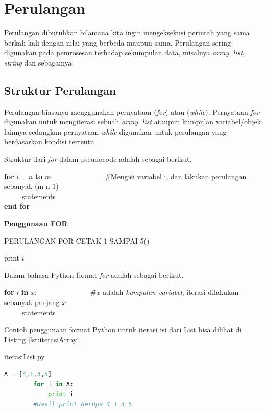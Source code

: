 \section{Perulangan}
Perulangan dibutuhkan bilamana kita ingin mengeksekusi perintah yang sama berkali-kali dengan nilai yang berbeda maupun sama. Perulangan sering digunakan pada pemrosesan terhadap sekumpulan data, misalnya \textit{array}, \textit{list}, \textit{string} dan sebagainya.

\subsection{Struktur Perulangan}
Perulangan biasanya menggunakan pernyataan (\textit{for}) atau (\textit{while}). Pernyataan \textit{for} digunakan untuk mengiterasi sebuah \textit{array}, \textit{list} ataupun kumpulan variabel/objek lainnya sedangkan pernyataan \textit{while} digunakan untuk perulangan yang berdasarkan kondisi tertentu.

Struktur dari \textit{for} dalam pseudocode adalah sebagai berikut.
\begin{tabbing}
\textbf{for} $i=n$ \textbf{to} $m$~~~~~~~~~~~~~~~\=\#Mengisi variabel i, dan lakukan perulangan sebanyak (m-n-1)\\
~~~~~statements\\
\textbf{end for}
\end{tabbing}

\begin{contoh}
	\textbf{Penggunaan FOR}
	\begin{algorithm}
	\caption{PERULANGAN-FOR-CETAK-1-SAMPAI-5()}
		\begin{algorithmic}[1]
			\STATE print $i$
		\ENDFOR
		\STATE{}
		\STATE{}
		\end{algorithmic}
	\end{algorithm}
\end{contoh}

Dalam bahasa Python format \textit{for} adalah sebagai berikut.
\begin{tabbing}
\textbf{for} $i$ \textbf{in} $x$:~~~~~~~~~~~~~~~\=\#$x$ adalah \textit{kumpulan variabel}, iterasi dilakukan sebanyak panjang $x$\\
~~~~~statements\\
\end{tabbing}

Contoh penggunaan format Python untuk iterasi isi dari List bisa dilihat di Listing \ref{lst:iterasiArray}.
\begin{listprog}{iterasiList.py}
	\label{lst:iterasiArray}
	\begin{lstlisting}[language=Python]
		A = [4,1,3,5]
		for i in A:
			print i
		#Hasil print berupa 4 1 3 5
	\end{lstlisting}
\end{listprog}

